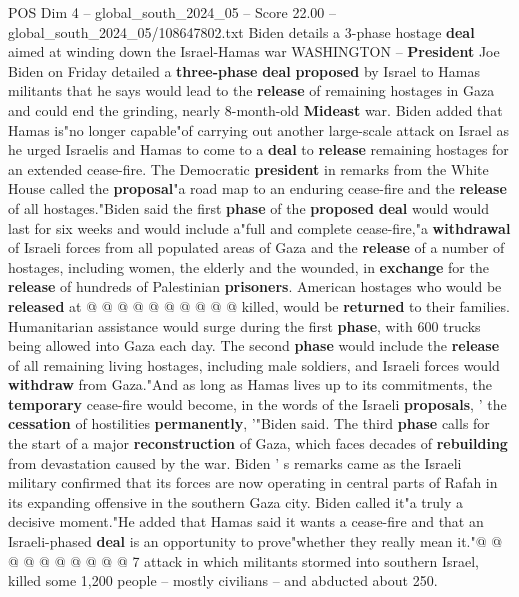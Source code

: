 \begin{textsample}{POS Dim 4 – global\_south\_2024\_05 – Score 22.00 – global\_south\_2024\_05/108647802.txt}  \label{ex:f4_pos_209}
Biden details a 3-phase hostage \textbf{deal} aimed at winding down the Israel-Hamas war WASHINGTON -- \textbf{President} Joe Biden on Friday detailed a \textbf{three-phase} \textbf{deal} \textbf{proposed} by Israel to Hamas militants that he says would lead to the \textbf{release} of remaining hostages in Gaza and could end the grinding, nearly 8-month-old \textbf{Mideast} war.
Biden added that Hamas is"no longer capable"of carrying out another large-scale attack on Israel as he urged Israelis and Hamas to come to a \textbf{deal} to \textbf{release} remaining hostages for an extended cease-fire.
The Democratic \textbf{president} in remarks from the White House called the \textbf{proposal}"a road map to an enduring cease-fire and the \textbf{release} of all hostages."Biden said the first \textbf{phase} of the \textbf{proposed} \textbf{deal} would would last for six weeks and would include a"full and complete cease-fire,"a \textbf{withdrawal} of Israeli forces from all populated areas of Gaza and the \textbf{release} of a number of hostages, including women, the elderly and the wounded, in \textbf{exchange} for the \textbf{release} of hundreds of Palestinian \textbf{prisoners}.
American hostages who would be \textbf{released} at @ @ @ @ @ @ @ @ @ @ killed, would be \textbf{returned} to their families.
Humanitarian assistance would surge during the first \textbf{phase}, with 600 trucks being allowed into Gaza each day.
The second \textbf{phase} would include the \textbf{release} of all remaining living hostages, including male soldiers, and Israeli forces would \textbf{withdraw} from Gaza."And as long as Hamas lives up to its commitments, the \textbf{temporary} cease-fire would become, in the words of the Israeli \textbf{proposals}, ' the \textbf{cessation} of hostilities \textbf{permanently}, '"Biden said.
The third \textbf{phase} calls for the start of a major \textbf{reconstruction} of Gaza, which faces decades of \textbf{rebuilding} from devastation caused by the war.
Biden ' s remarks came as the Israeli military confirmed that its forces are now operating in central parts of Rafah in its expanding offensive in the southern Gaza city.
Biden called it"a truly a decisive moment."He added that Hamas said it wants a cease-fire and that an Israeli-phased \textbf{deal} is an opportunity to prove"whether they really mean it."@ @ @ @ @ @ @ @ @ @ 7 attack in which militants stormed into southern Israel, killed some 1,200 people -- mostly civilians -- and abducted about 250.

\end{textsample}
